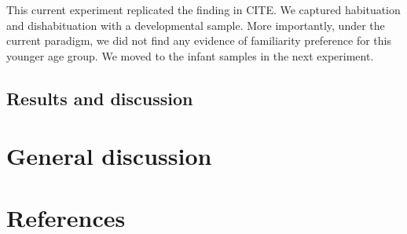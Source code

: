 \documentclass[10pt, letterpaper]{article}
\begin{document}
This current experiment replicated the finding in CITE. We captured
habituation and dishabituation with a developmental sample. More
importantly, under the current paradigm, we did not find any evidence of
familiarity preference for this younger age group. We moved to the
infant samples in the next experiment.

\hypertarget{results-and-discussion-1}{%
\subsection{Results and discussion}\label{results-and-discussion-1}}

\hypertarget{general-discussion}{%
\section{General discussion}\label{general-discussion}}

\hypertarget{references}{%
\section{References}\label{references}}

\setlength{\parindent}{-0.1in} 
\setlength{\leftskip}{0.125in}

\noindent


\end{document}

